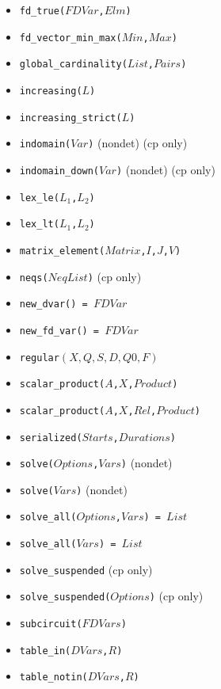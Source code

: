 \documentclass[10pt]{article}
\begin{document}
\begin{multicols}{2}
\begin{scriptsize}
\begin{itemize}
\item \texttt{fd\_true($FDVar$,$Elm$)}
\item \texttt{fd\_vector\_min\_max($Min$,$Max$)}
\item \texttt{global\_cardinality($List$,$Pairs$)}
\item \texttt{increasing($L$)}
\item \texttt{increasing\_strict($L$)}
\item \texttt{indomain($Var$)} (nondet) (cp only)
\item \texttt{indomain\_down($Var$)} (nondet) (cp only)
\item \texttt{lex\_le($L_1$,$L_2$)}
\item \texttt{lex\_lt($L_1$,$L_2$)}
\item \texttt{matrix\_element($Matrix$,$I$,$J$,$V$)}
\item \texttt{neqs($NeqList$)} (cp only)
\item \texttt{new\_dvar() = $FDVar$}
\item \texttt{new\_fd\_var() = $FDVar$}
\item \texttt{regular$(X, Q, S, D, Q0, F)$}
\item \texttt{scalar\_product($A$,$X$,$Product$)} 
\item \texttt{scalar\_product($A$,$X$,$Rel$,$Product$)}
\item \texttt{serialized($Starts$,$Durations$)}
\item \texttt{solve($Options$,$Vars$)} (nondet)
\item \texttt{solve($Vars$)} (nondet)
\item \texttt{solve\_all($Options$,$Vars$) = $List$}
\item \texttt{solve\_all($Vars$) = $List$}
\item \texttt{solve\_suspended} (cp only)
\item \texttt{solve\_suspended($Options$)} (cp only)
\item \texttt{subcircuit($FDVars$)} 
\item \texttt{table\_in($DVars$,$R$)}
\item \texttt{table\_notin($DVars$,$R$)}
\end{itemize}
\end{scriptsize}


\end{multicols}
\end{document}
